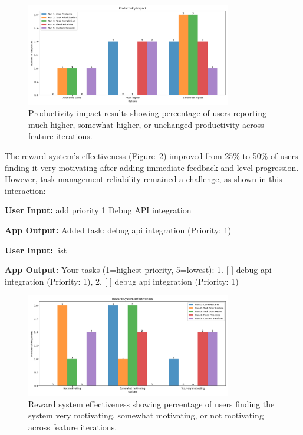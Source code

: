 \documentclass{article} %
\begin{document}
\begin{figure}[h]
  \centering
  \includegraphics[width=0.8\textwidth]{productivity_impact_bar.png}
  \caption{Productivity impact results showing percentage of users reporting much higher, somewhat higher, or unchanged productivity across feature iterations.}
  \label{fig:productivity_results}
\end{figure}

The reward system's effectiveness (Figure~\ref{fig:reward_results}) improved from 25\% to 50\% of users finding it very motivating after adding immediate feedback and level progression. However, task management reliability remained a challenge, as shown in this interaction:

\begin{Userinput}
\textbf{User Input:} add priority 1 Debug API integration
\end{Userinput}

\begin{Appoutput}
\textbf{App Output:} Added task: debug api integration (Priority: 1)
\end{Appoutput}

\begin{Userinput}
\textbf{User Input:} list
\end{Userinput}

\begin{Appoutput}
\textbf{App Output:} Your tasks (1=highest priority, 5=lowest): 1. [ ] debug api integration (Priority: 1), 2. [ ] debug api integration (Priority: 1)
\end{Appoutput}

\begin{figure}[h]
  \centering
  \includegraphics[width=0.8\textwidth]{reward_effectiveness_bar.png}
  \caption{Reward system effectiveness showing percentage of users finding the system very motivating, somewhat motivating, or not motivating across feature iterations.}
  \label{fig:reward_results}
\end{figure}
\end{document}
